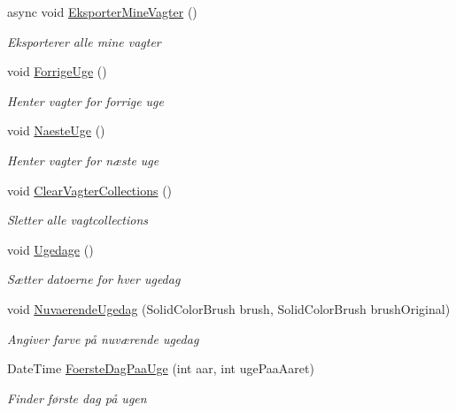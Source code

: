 \begin{DoxyCompactItemize}
async void \hyperlink{class__1aarsproeve_1_1_view_model_1_1_vagtplan_view_model_a716adb448b19801ef8f78002e2ea6409}{Eksporter\+Mine\+Vagter} ()
\begin{DoxyCompactList}\small\item\em Eksporterer alle mine vagter \end{DoxyCompactList}\item 
void \hyperlink{class__1aarsproeve_1_1_view_model_1_1_vagtplan_view_model_ae298778e1242b354d4ccd8fa69274ee3}{Forrige\+Uge} ()
\begin{DoxyCompactList}\small\item\em Henter vagter for forrige uge \end{DoxyCompactList}\item 
void \hyperlink{class__1aarsproeve_1_1_view_model_1_1_vagtplan_view_model_a2a3d1685dda9a4d337820ca42e8e524a}{Naeste\+Uge} ()
\begin{DoxyCompactList}\small\item\em Henter vagter for næste uge \end{DoxyCompactList}\item 
void \hyperlink{class__1aarsproeve_1_1_view_model_1_1_vagtplan_view_model_aab7593de820ec5b6e735edc002af4f14}{Clear\+Vagter\+Collections} ()
\begin{DoxyCompactList}\small\item\em Sletter alle vagtcollections \end{DoxyCompactList}\item 
void \hyperlink{class__1aarsproeve_1_1_view_model_1_1_vagtplan_view_model_af345ce712696e7401e284d71323e9619}{Ugedage} ()
\begin{DoxyCompactList}\small\item\em Sætter datoerne for hver ugedag \end{DoxyCompactList}\item 
void \hyperlink{class__1aarsproeve_1_1_view_model_1_1_vagtplan_view_model_a584ab28ecfddbb2248d7b55a3ed10a34}{Nuvaerende\+Ugedag} (Solid\+Color\+Brush brush, Solid\+Color\+Brush brush\+Original)
\begin{DoxyCompactList}\small\item\em Angiver farve på nuværende ugedag \end{DoxyCompactList}\item 
Date\+Time \hyperlink{class__1aarsproeve_1_1_view_model_1_1_vagtplan_view_model_a319e58fbb6c1975935fbc5426ff4c02d}{Foerste\+Dag\+Paa\+Uge} (int aar, int uge\+Paa\+Aaret)
\begin{DoxyCompactList}\small\item\em Finder første dag på ugen \end{DoxyCompactList}\end{DoxyCompactItemize}
